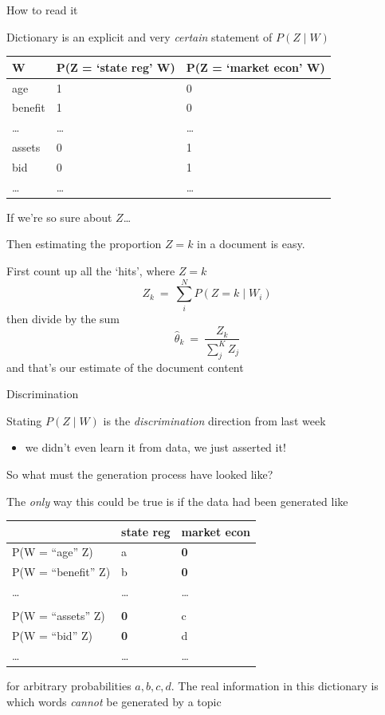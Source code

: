 \documentclass{hertieteaching}
\begin{document}
\begin{frame}{How to read it}

Dictionary is an explicit and very \emph{certain} statement of
$P(Z \mid W)$

\begin{longtable}[]{@{}lll@{}}
\toprule
W & P(Z = `state reg' \textbar{} W) & P(Z = `market econ' \textbar{}
W)\tabularnewline
\midrule
\endhead
age & 1 & 0\tabularnewline
benefit & 1 & 0\tabularnewline
\ldots{} & \ldots{} & \ldots{}\tabularnewline
assets & 0 & 1\tabularnewline
bid & 0 & 1\tabularnewline
\ldots{} & \ldots{} & \ldots{}\tabularnewline
\bottomrule
\end{longtable}

\end{frame}

\begin{frame}{If we're so sure about $Z$\ldots}

Then estimating the proportion $Z=k$ in a document is easy.

First count up all the `hits', where $Z=k$
$$
Z_k ~=~ \sum^N_{i} P(Z = k \mid W_i)
$$
then divide by the sum
$$
\hat{\theta}_k ~=~ \frac{Z_k}{\sum^K_{j} Z_j}
$$
and that's our estimate of the document content
\end{frame}

\begin{frame}{Discrimination}

Stating $P(Z \mid W)$ is the \textit{discrimination} direction from last week
\begin{itemize}
  \item we didn't even learn it from data, we just asserted it!
\end{itemize}

So what must the generation process have looked like? 
\pause

The \emph{only} way this could be true is if the data had been generated
like

\begin{longtable}[]{@{}lll@{}}
\toprule
& state reg & market econ\tabularnewline
\midrule
\endhead
P(W = ``age'' \textbar{} Z) & a & \textbf{0}\tabularnewline
P(W = ``benefit'' \textbar{} Z) & b & \textbf{0}\tabularnewline
\ldots{} & \ldots{} & \ldots{}\tabularnewline
& &\tabularnewline
P(W = ``assets'' \textbar{} Z) & \textbf{0} & c\tabularnewline
P(W = ``bid'' \textbar{} Z) & \textbf{0} & d\tabularnewline
\ldots{} & \ldots{} & \ldots{}\tabularnewline
\end{longtable}

for arbitrary probabilities $a,b,c,d$. The real information in this dictionary is which words \textit{cannot} be generated by a topic

\end{frame}
\end{document}
